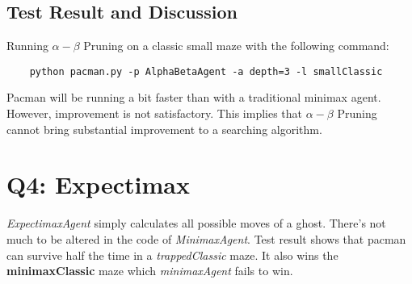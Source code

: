 \documentclass{article}
\begin{document}
  \subsection{Test Result and Discussion}
  Running $\alpha-\beta$ Pruning on a classic small maze with the following command:
\begin{verbatim}
    python pacman.py -p AlphaBetaAgent -a depth=3 -l smallClassic
\end{verbatim}\par
    Pacman will be running a bit faster than with a traditional minimax agent. However, improvement is not satisfactory. This implies that $\alpha-\beta$ Pruning cannot bring substantial improvement to a searching algorithm.
    
\section{Q4: Expectimax}
\textit{ExpectimaxAgent} simply calculates all possible moves of a ghost. There's not much to be altered in the code of \textit{MinimaxAgent}. Test result shows that pacman can survive half the time in a \textit{trappedClassic} maze. It also wins the \textbf{minimaxClassic} maze which \textit{minimaxAgent} fails to win.
\end{document}
